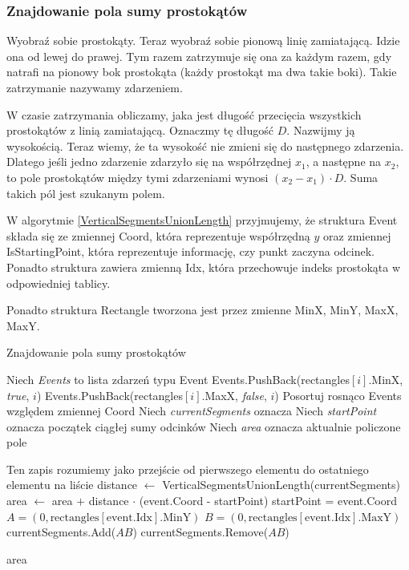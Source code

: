 \subsubsection{Znajdowanie pola sumy prostokątów}
Wyobraź sobie prostokąty. Teraz wyobraź sobie pionową linię zamiatającą. Idzie ona od lewej do prawej. Tym
razem zatrzymuje się ona za każdym razem, gdy natrafi na pionowy bok prostokąta (każdy prostokąt ma dwa takie
boki). Takie zatrzymanie nazywamy zdarzeniem. 

W czasie zatrzymania obliczamy, jaka jest długość przecięcia wszystkich prostokątów z linią zamiatającą. Oznaczmy tę długość $D$. Nazwijmy ją wysokością. Teraz wiemy, że ta wysokość
nie zmieni się do następnego zdarzenia. Dlatego jeśli jedno zdarzenie zdarzyło się na współrzędnej $x_1$, a następne na
$x_2$, to pole prostokątów między tymi zdarzeniami wynosi $(x_2-x_1)\cdot D$. Suma takich pól jest szukanym polem.

W algorytmie \ref{VerticalSegmentsUnionLength} przyjmujemy, że
struktura Event składa się ze zmiennej Coord, która reprezentuje
współrzędną $y$ oraz zmiennej IsStartingPoint, która 
reprezentuje informację, czy punkt zaczyna odcinek. Ponadto 
struktura zawiera zmienną Idx, która przechowuje
indeks prostokąta w odpowiedniej tablicy.

Ponadto struktura Rectangle tworzona jest przez zmienne MinX, MinY, MaxX, MaxY.

\begin{algorithm}[H]
	\caption{Znajdowanie pola sumy prostokątów}
	\begin{algorithmic}[1]
		\State Niech \textit{Events} to lista zdarzeń typu Event
		\State Events.PushBack(rectangles$[i]$.MinX, \textit{true}, $i$)
		\State Events.PushBack(rectangles$[i]$.MaxX, \textit{false}, $i$)
		\EndFor
		\State Posortuj rosnąco Events względem zmiennej Coord
		\State Niech \textit{currentSegments} oznacza 
		\State Niech \textit{startPoint} oznacza początek ciągłej sumy odcinków
		\State Niech \textit{area} oznacza aktualnie policzone pole
		
		 \Comment Ten zapis rozumiemy jako przejście od pierwszego elementu do ostatniego elementu na liście
		\State distance $\gets$  VerticalSegmentsUnionLength(currentSegments)
		\State area $\gets$ area $+$  distance $\cdot$ (event.Coord - startPoint)
		\EndIf
		\State startPoint = event.Coord
		\State $A = (0, \text{rectangles}[\text{event.Idx}].\text{MinY})$
		\State $B = (0, \text{rectangles}[\text{event.Idx}].\text{MaxY})$
		\State currentSegments.Add($AB$)
		\Else
		\State currentSegments.Remove($AB$)
		\EndIf
		\EndFor
		
		\State \Return area
		\EndProcedure
	\end{algorithmic}
	\label{RectangleUnionArea}
\end{algorithm}

